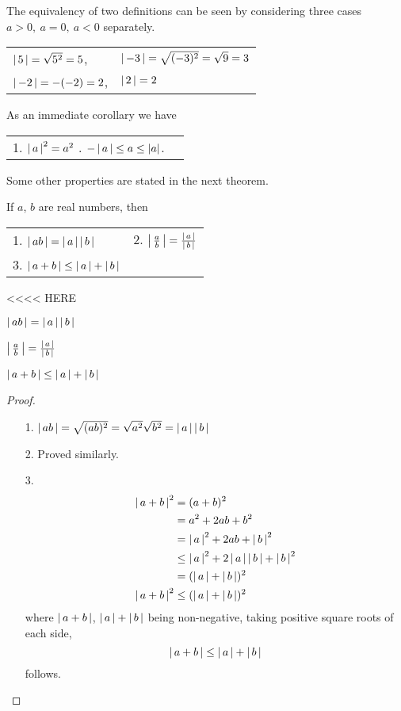 \documentclass[11pt]{amsbook}
\begin{document}
The equivalency of two definitions can be seen 
by considering three cases 
$a > 0, \ a=0, \ a < 0$ separately.

\begin{tabular}{ll}
$\hAbs{5} = \sqrt{5^2} = 5$, 
&$\hAbs{-3} = \sqrt{(-3)^2} = \sqrt{9} = 3$ \\
$\hAbs{-2} = -(-2) = 2$, \quad \quad
& $\hAbs{2} = 2$
\end{tabular}

As an immediate corollary we have

\begin{cor} 
	\begin{tabular}{ll}
	1. $\hAbs{a}^{2} = a^{2}$ \quad \quad
	2. $-\hAbs{a} \leq a \leq |a|$.
	\end{tabular} 
\end{cor}
Some other properties are stated in the next theorem.
\begin{thm}
	If $a$, $b$ are real numbers, then \\
	\begin{tabular}{ll}
		1. $\hAbs{ab} = \hAbs{a} \hAbs{b}$ 
		&2. $\hAbs{\frac{a}{b}} = \frac{\hAbs{a}}{\hAbs{b}}$\\ 
		3. $\hAbs{a + b} \leq \hAbs{a} + \hAbs{b}$ \quad \quad
	\end{tabular}
{\color{blue} %
		<<<< HERE
} %
	\begin{hbColi}{2}
		\item $\hAbs{ab} = \hAbs{a} \hAbs{b}$ 
		\item $\hAbs{\frac{a}{b}} = \frac{\hAbs{a}}{\hAbs{b}}$
		\item $\hAbs{a + b} \leq \hAbs{a} + \hAbs{b}$ \quad \quad
	\end{hbColi}

	\begin{proof}
	\begin{enumerate}
	
		\item [1.]
		$\hAbs{ab} 
		= \sqrt{(ab)^{2}}  
		= \sqrt{a^{2}}\sqrt{b^{2}} 
		= \hAbs{a} \hAbs{b}$
		
		\item [2.]
		Proved similarly.
		
		\item [3.]
		\begin{align*}
			\hAbs{a + b}^{2} 
			&= (a+b)^{2} \\
			&= a^{2} + 2ab + b^{2} \\
			&= \hAbs{a}^{2} + 2ab + \hAbs{b}^{2} \\
			&\leq \hAbs{a}^{2} + 2 \hAbs{a} \hAbs{b} + \hAbs{b}^{2} \\
			&= (\hAbs{a} + \hAbs{b})^{2} \\
			\hAbs{a + b}^{2} 
			&\leq (\hAbs{a} + \hAbs{b})^{2} 
		\end{align*}
		where 
		$\hAbs{a + b}$, 
		$\hAbs{a} + \hAbs{b}$ 
		being non-negative, taking positive square roots of each side,
		\[
			\hAbs{a + b} \leq \hAbs{a} + \hAbs{b}
		\]
		follows.
	\end{enumerate}
	\end{proof}
\end{thm}
\end{document}
